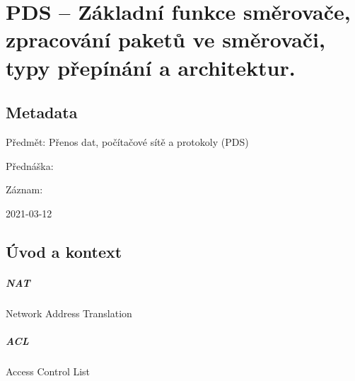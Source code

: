 

\graphicspath{{pds/smerovace/figures}}


\chapter{PDS -- Základní funkce směrovače, zpracování paketů ve směrovači, typy přepínání a architektur.}


\section{Metadata}

\begin{compactitem}
    \item Předmět: Přenos dat, počítačové sítě a protokoly (PDS)
    \item Přednáška:
    \begin{compactitem}
        \item {}
    \end{compactitem}
    \item Záznam:
    \begin{compactitem}
        \item 2021-03-12
    \end{compactitem}
\end{compactitem}


\section{Úvod a kontext}

\paragraph*{NAT} Network Address Translation 

\paragraph*{ACL} Access Control List 

